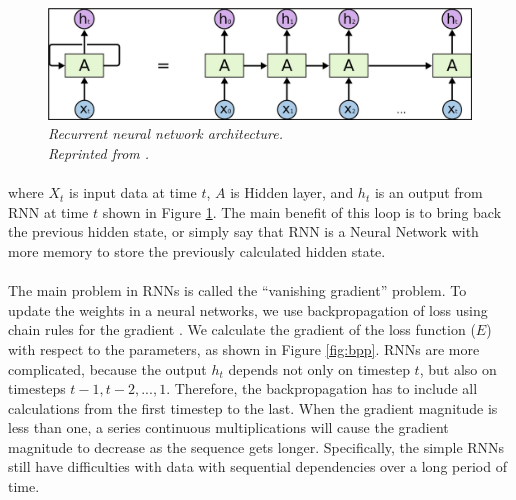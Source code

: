 \begin{figure}[H]
  \centering
   \caption[Recurrent neural network architecture.]{\emph{Recurrent neural network architecture. \\ 
   Reprinted from \citeauthor{olah_2015} \citeyear{olah_2015}.}}\label{fig:RNN}
  \includegraphics[scale = 0.2]{figures/RNN.jpg}  
\end{figure}

\paragraph{}
where $X_t$ is input data at time $t$, $A$ is Hidden layer, and $h_t$ is an output from RNN at time $t$ shown in Figure \ref{fig:RNN}. The main benefit of this loop is to bring back the previous hidden state, or simply say that RNN is a Neural Network with more memory to store the previously calculated hidden state. 

\paragraph{}
The main problem in RNNs is called the ``vanishing gradient'' problem. To update the weights in a neural networks, we use backpropagation of loss using chain rules for the gradient \cite{arnx_2019}. We calculate the gradient of the loss function ($E$) with respect to the parameters, as shown in Figure \ref{fig:bpp}. RNNs are more complicated, because the output $h_t$ depends not only on timestep $t$, but also on timesteps $t-1, t-2, ..., 1$. Therefore, the backpropagation has to include all calculations from the first timestep to the last. When the gradient magnitude is less than one, a series continuous multiplications will cause the gradient magnitude to decrease as the sequence gets longer. Specifically, the simple RNNs still have difficulties with data with sequential dependencies over a long period of time.

